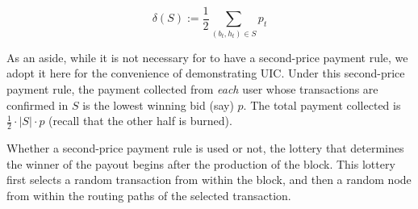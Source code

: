 \begin{equation}\label{eqn::burn}
    \delta(S) := \frac{1}{2} \sum_{(b_t,h_t)\in S} p_t
\end{equation}

As an aside, while it is not necessary for \ourTFM to have a second-price payment rule, we adopt it here for the convenience of demonstrating UIC. Under this second-price payment rule, the payment collected from \emph{each} user whose transactions are confirmed in $S$ is the lowest winning bid (say) $p$. The total payment collected is $\frac{1}{2}\cdot|S|\cdot p$ (recall that the other half is burned).

Whether a second-price payment rule is used or not, the lottery that determines the winner of the payout begins after the production of the block. This lottery first selects a random transaction from within the block, and then a random node from within the routing paths of the selected transaction. 

